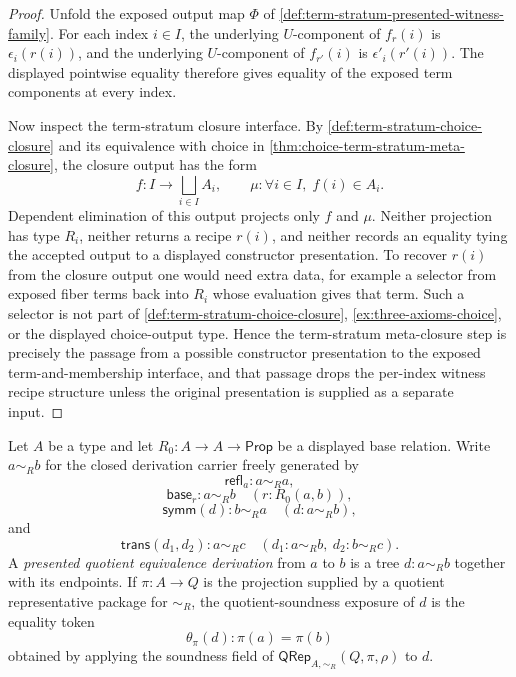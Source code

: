 \begin{proof}
Unfold the exposed output map $\Phi$ of \autoref{def:term-stratum-presented-witness-family}. For each index $i\in I$, the underlying $U$-component of $f_r(i)$ is $\epsilon_i(r(i))$, and the underlying $U$-component of $f_{r'}(i)$ is $\epsilon'_i(r'(i))$. The displayed pointwise equality therefore gives equality of the exposed term components at every index.

Now inspect the term-stratum closure interface. By \autoref{def:term-stratum-choice-closure} and its equivalence with choice in \autoref{thm:choice-term-stratum-meta-closure}, the closure output has the form
$$
f:I\to\bigsqcup_{i\in I}A_i,
\qquad
\mu:\forall i\in I,\;f(i)\in A_i.
$$
Dependent elimination of this output projects only $f$ and $\mu$. Neither projection has type $R_i$, neither returns a recipe $r(i)$, and neither records an equality tying the accepted output to a displayed constructor presentation. To recover $r(i)$ from the closure output one would need extra data, for example a selector from exposed fiber terms back into $R_i$ whose evaluation gives that term. Such a selector is not part of \autoref{def:term-stratum-choice-closure}, \autoref{ex:three-axioms-choice}, or the displayed choice-output type. Hence the term-stratum meta-closure step is precisely the passage from a possible constructor presentation to the exposed term-and-membership interface, and that passage drops the per-index witness recipe structure unless the original presentation is supplied as a separate input.
\end{proof}

\begin{definition}
\label{def:presented-quotient-equivalence-derivation}
Let $A$ be a type and let $R_0:A\to A\to\mathsf{Prop}$ be a displayed base relation. Write $a\sim_R b$ for the closed derivation carrier freely generated by
$$
\mathsf{refl}_a:a\sim_R a,
$$
$$
\mathsf{base}_r:a\sim_R b\quad(r:R_0(a,b)),
$$
$$
\mathsf{symm}(d):b\sim_R a\quad(d:a\sim_R b),
$$
and
$$
\mathsf{trans}(d_1,d_2):a\sim_R c\quad(d_1:a\sim_R b,\ d_2:b\sim_R c).
$$
A \emph{presented quotient equivalence derivation} from $a$ to $b$ is a tree $d:a\sim_R b$ together with its endpoints. If $\pi:A\to Q$ is the projection supplied by a quotient representative package for $\sim_R$, the quotient-soundness exposure of $d$ is the equality token
$$
\theta_\pi(d):\pi(a)=\pi(b)
$$
obtained by applying the soundness field of $\mathsf{QRep}_{A,\sim_R}(Q,\pi,\rho)$ to $d$.
\end{definition}

